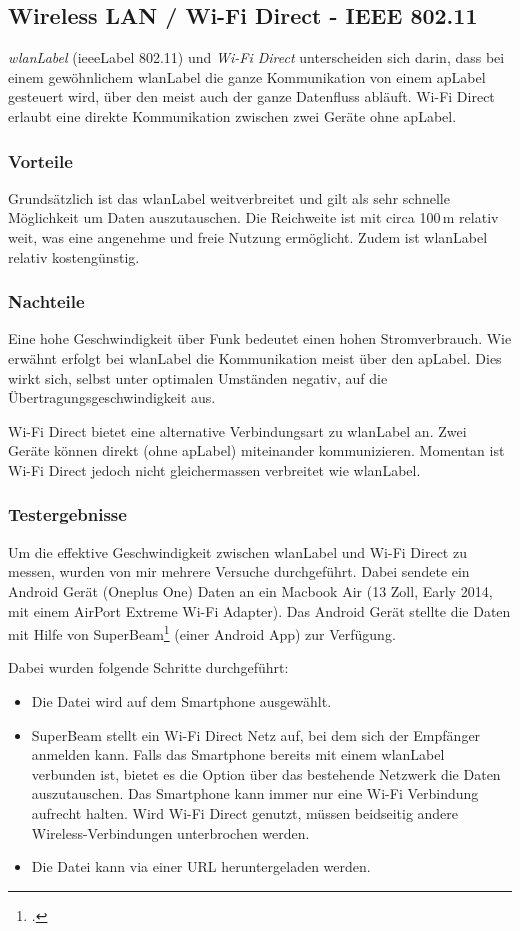 \subsection{Wireless LAN / Wi-Fi Direct - IEEE 802.11}
\textit{\gls{wlanLabel}} (\gls{ieeeLabel} 802.11) und \textit{Wi-Fi Direct} unterscheiden sich darin, dass bei einem gewöhnlichem \gls{wlanLabel} die ganze Kommunikation von einem \gls{apLabel} gesteuert wird, über den meist auch der ganze Datenfluss abläuft.
Wi-Fi Direct erlaubt eine direkte Kommunikation zwischen zwei Geräte ohne \gls{apLabel}.

\subsubsection{Vorteile}
Grundsätzlich ist das \gls{wlanLabel} weitverbreitet und gilt als sehr schnelle Möglichkeit um Daten auszutauschen.
Die Reichweite ist mit circa 100\,m relativ weit, was eine angenehme und freie Nutzung ermöglicht.
Zudem ist \gls{wlanLabel} relativ kostengünstig.

\subsubsection{Nachteile}
Eine hohe Geschwindigkeit über Funk bedeutet einen hohen Stromverbrauch.
Wie erwähnt erfolgt bei \gls{wlanLabel} die Kommunikation meist über den \gls{apLabel}.
Dies wirkt sich, selbst unter optimalen Umständen negativ, auf die Übertragungsgeschwindigkeit aus.

Wi-Fi Direct bietet eine alternative Verbindungsart zu \gls{wlanLabel }an. Zwei Geräte können direkt (ohne \gls{apLabel}) miteinander kommunizieren.
Momentan ist Wi-Fi Direct jedoch nicht gleichermassen verbreitet wie \gls{wlanLabel}.

\subsubsection{Testergebnisse}
Um die effektive Geschwindigkeit zwischen \gls{wlanLabel} und Wi-Fi Direct zu messen, wurden von mir mehrere Versuche durchgeführt.
Dabei sendete ein Android Gerät (Oneplus One) Daten an ein Macbook Air (13 Zoll, Early 2014, mit einem AirPort Extreme Wi-Fi Adapter).
Das Android Gerät stellte die Daten mit Hilfe von SuperBeam\footcite{SuperBeam_WiFi_Direct_Share_Android_Apps_on_Google_Play_2015-05-22} (einer Android App) zur Verfügung.

Dabei wurden folgende Schritte durchgeführt:
\begin{itemize}
	\item Die Datei wird auf dem Smartphone ausgewählt.
	\item SuperBeam stellt ein Wi-Fi Direct Netz auf, bei dem sich der Empfänger anmelden kann. Falls das Smartphone bereits mit einem \gls{wlanLabel} verbunden ist, bietet es die Option über das bestehende Netzwerk die Daten auszutauschen.
	Das Smartphone kann immer nur eine Wi-Fi Verbindung aufrecht halten.
	Wird Wi-Fi Direct genutzt, müssen beidseitig andere Wireless-Verbindungen unterbrochen werden.
	\item Die Datei kann via einer URL heruntergeladen werden.
\end{itemize}

